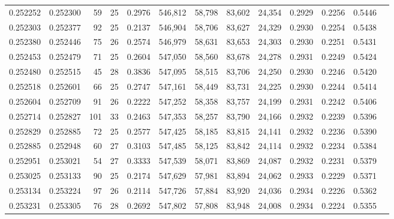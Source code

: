 \begin{tabular}{rrrrrrrrrrrrr}
0.252252 & 0.252300 &  59 &  25 &                                     0.2976 & 546,812 &  58,798 &  83,602 &  24,354 & 0.2929 & 0.2256 & 0.5446 \\
0.252303 & 0.252377 &  92 &  25 &                                     0.2137 & 546,904 &  58,706 &  83,627 &  24,329 & 0.2930 & 0.2254 & 0.5438 \\
0.252380 & 0.252446 &  75 &  26 &                                     0.2574 & 546,979 &  58,631 &  83,653 &  24,303 & 0.2930 & 0.2251 & 0.5431 \\
0.252453 & 0.252479 &  71 &  25 &                                     0.2604 & 547,050 &  58,560 &  83,678 &  24,278 & 0.2931 & 0.2249 & 0.5424 \\
0.252480 & 0.252515 &  45 &  28 &                                     0.3836 & 547,095 &  58,515 &  83,706 &  24,250 & 0.2930 & 0.2246 & 0.5420 \\
0.252518 & 0.252601 &  66 &  25 &                                     0.2747 & 547,161 &  58,449 &  83,731 &  24,225 & 0.2930 & 0.2244 & 0.5414 \\
0.252604 & 0.252709 &  91 &  26 &                                     0.2222 & 547,252 &  58,358 &  83,757 &  24,199 & 0.2931 & 0.2242 & 0.5406 \\
0.252714 & 0.252827 & 101 &  33 &                                     0.2463 & 547,353 &  58,257 &  83,790 &  24,166 & 0.2932 & 0.2239 & 0.5396 \\
0.252829 & 0.252885 &  72 &  25 &                                     0.2577 & 547,425 &  58,185 &  83,815 &  24,141 & 0.2932 & 0.2236 & 0.5390 \\
0.252885 & 0.252948 &  60 &  27 &                                     0.3103 & 547,485 &  58,125 &  83,842 &  24,114 & 0.2932 & 0.2234 & 0.5384 \\
0.252951 & 0.253021 &  54 &  27 &                                     0.3333 & 547,539 &  58,071 &  83,869 &  24,087 & 0.2932 & 0.2231 & 0.5379 \\
0.253025 & 0.253133 &  90 &  25 &                                     0.2174 & 547,629 &  57,981 &  83,894 &  24,062 & 0.2933 & 0.2229 & 0.5371 \\
0.253134 & 0.253224 &  97 &  26 &                                     0.2114 & 547,726 &  57,884 &  83,920 &  24,036 & 0.2934 & 0.2226 & 0.5362 \\
0.253231 & 0.253305 &  76 &  28 &                                     0.2692 & 547,802 &  57,808 &  83,948 &  24,008 & 0.2934 & 0.2224 & 0.5355 \\

\end{tabular}
